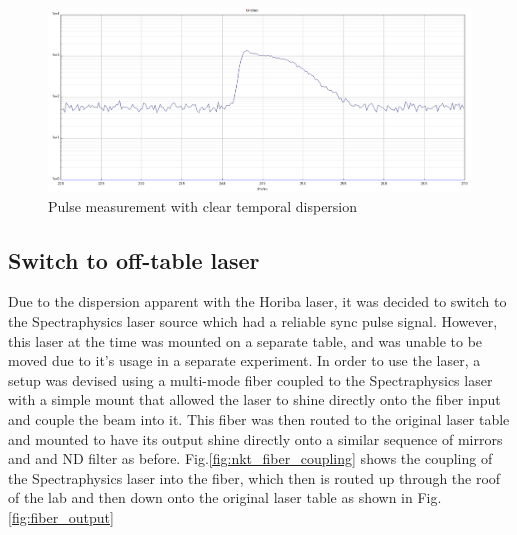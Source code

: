 \documentclass[a4paper]{article}
\begin{document}
\begin{figure}
\centering
\includegraphics[width=1.0\textwidth]{figures/horiba laser.PNG}
\caption{\label{fig:pulse_1}Pulse measurement with clear temporal dispersion}
\end{figure}

\subsection{Switch to off-table laser}

Due to the dispersion apparent with the Horiba laser, it was decided to switch to the Spectraphysics laser source which had a reliable sync pulse signal. However, this laser at the time was mounted on a separate table, and was unable to be moved due to it's usage in a separate experiment. In order to use the laser, a setup was devised using a multi-mode fiber coupled to the Spectraphysics laser with a simple mount that allowed the laser to shine directly onto the fiber input and couple the beam into it. This fiber was then routed to the original laser table and mounted to have its output shine directly onto a similar sequence of mirrors and and ND filter as before. Fig.\ref{fig:nkt_fiber_coupling} shows the coupling of the Spectraphysics laser into the fiber, which then is routed up through the roof of the lab and then down onto the original laser table as shown in Fig.\ref{fig:fiber_output}
\end{document}
